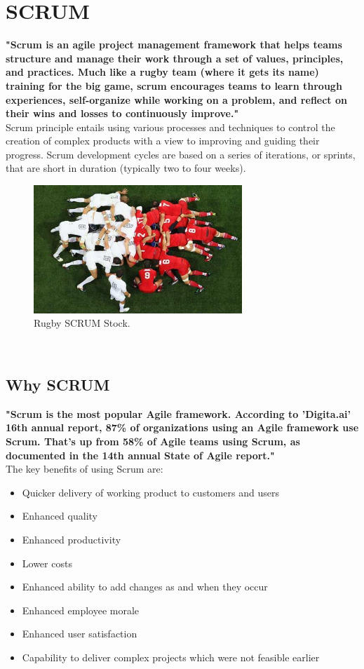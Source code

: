 \section{SCRUM}
\textbf{"Scrum is an agile project management framework that helps teams structure and manage their work through a set of values, principles, and practices. Much like a rugby team (where it gets its name) training for the big game, scrum encourages teams to learn through experiences, self-organize while working on a problem, and reflect on their wins and losses to continuously improve."}\cite{samplewebs1}\\
Scrum principle entails using various processes and techniques to control the creation of complex products with a view to improving and guiding their progress.
Scrum development cycles are based on a series of iterations, or sprints, that are short in duration (typically two to four weeks).
\begin{figure}[htbp]
    \centering
    \includegraphics[width=0.7\textwidth]{figures/rugbystock.jpg} 
    \caption{Rugby SCRUM Stock.}
\end{figure} \
\subsection{Why SCRUM}
\textbf{"Scrum is the most popular Agile framework. According to 'Digita.ai' 16th annual report, 87\% of organizations using an Agile framework use Scrum. That’s up from 58\% of Agile teams using Scrum, as documented in the 14th annual State of Agile report."\cite{samplewebs2}} \\
The key benefits of using Scrum are:

\begin{itemize}
    \item Quicker delivery of working product to customers and users
    \item Enhanced quality
    \item Enhanced productivity
    \item Lower costs
    \item Enhanced ability to add changes as and when they occur
    \item Enhanced employee morale
    \item Enhanced user satisfaction
    \item Capability to deliver complex projects which were not feasible earlier
\end{itemize}
